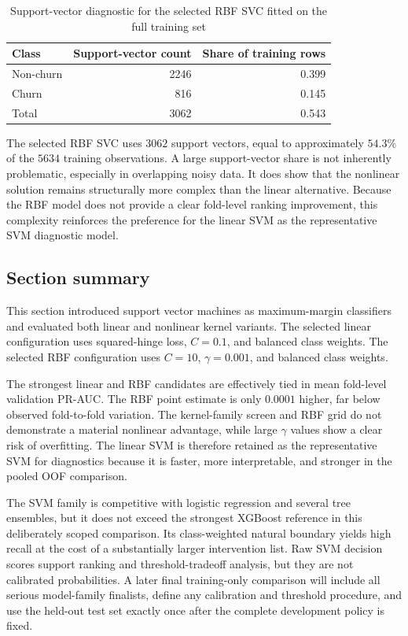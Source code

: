 \begin{table}[H]
\centering
\small
\begin{tabular}{lrr}
\toprule
Class & Support-vector count & Share of training rows \\
\midrule
Non-churn & 2246 & 0.399 \\
Churn & 816 & 0.145 \\
Total & 3062 & 0.543 \\
\bottomrule
\end{tabular}
\caption{Support-vector diagnostic for the selected RBF SVC fitted on the full training set}
\label{tab:svm-support-vectors}
\end{table}

The selected RBF SVC uses \(3062\) support vectors, equal to approximately \(54.3\%\) of the \(5634\) training observations. A large support-vector share is not inherently problematic, especially in overlapping noisy data. It does show that the nonlinear solution remains structurally more complex than the linear alternative. Because the RBF model does not provide a clear fold-level ranking improvement, this complexity reinforces the preference for the linear SVM as the representative SVM diagnostic model.

\subsection{Section summary}

This section introduced support vector machines as maximum-margin classifiers and evaluated both linear and nonlinear kernel variants. The selected linear configuration uses squared-hinge loss, \(C=0.1\), and balanced class weights. The selected RBF configuration uses \(C=10\), \(\gamma=0.001\), and balanced class weights.

The strongest linear and RBF candidates are effectively tied in mean fold-level validation PR-AUC. The RBF point estimate is only \(0.0001\) higher, far below observed fold-to-fold variation. The kernel-family screen and RBF grid do not demonstrate a material nonlinear advantage, while large \(\gamma\) values show a clear risk of overfitting. The linear SVM is therefore retained as the representative SVM for diagnostics because it is faster, more interpretable, and stronger in the pooled OOF comparison.

The SVM family is competitive with logistic regression and several tree ensembles, but it does not exceed the strongest XGBoost reference in this deliberately scoped comparison. Its class-weighted natural boundary yields high recall at the cost of a substantially larger intervention list. Raw SVM decision scores support ranking and threshold-tradeoff analysis, but they are not calibrated probabilities. A later final training-only comparison will include all serious model-family finalists, define any calibration and threshold procedure, and use the held-out test set exactly once after the complete development policy is fixed.
